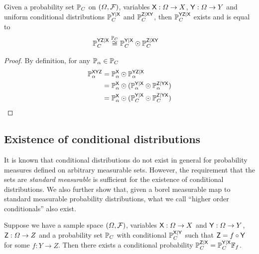 \begin{theorem}\label{lem:joint_conditional}
Given a probability set $\mathbb{P}_C$ on $(\Omega,\mathcal{F})$, variables $\mathsf{X}:\Omega\to X$, $\mathsf{Y}:\Omega\to Y$ and uniform conditional distributions $\mathbb{P}_C^{\mathsf{Y}|\mathsf{X}}$ and $\mathbb{P}_C^{\mathsf{Z}|\mathsf{XY}}$, then $\mathbb{P}_C^{\mathsf{YZ}|\mathsf{X}}$ exists and is equal to
\begin{align}
    \mathbb{P}_C^{\mathsf{YZ}|\mathsf{X}} &\overset{\mathbb{P}_C}{\cong} \mathbb{P}_C^{\mathsf{Y}|\mathsf{X}}\odot \mathbb{P}_C^{\mathsf{Z}|\mathsf{XY}}
\end{align}
\end{theorem}

\begin{proof}
By definition, for any $\mathbb{P}_\alpha\in \mathbb{P}_C$
\begin{align}
    \mathbb{P}_\alpha^{\mathsf{XYZ}} &= \mathbb{P}_\alpha^{\mathsf{X}}\odot \mathbb{P}_\alpha^{\mathsf{YZ}|\mathsf{X}}\\
                               &= \mathbb{P}_\alpha^{\mathsf{X}}\odot(\mathbb{P}_\alpha^{\mathsf{Y}|\mathsf{X}}\odot \mathbb{P}_\alpha^{\mathsf{Z}|\mathsf{YX}})\\
                               &= \mathbb{P}_\alpha^{\mathsf{X}}\odot(\mathbb{P}_C^{\mathsf{Y}|\mathsf{X}}\odot \mathbb{P}_C^{\mathsf{Z}|\mathsf{YX}})
\end{align}
\end{proof}

\subsection{Existence of conditional distributions}

It is known that conditional distributions do not exist in general for probability measures defined on arbitrary measurable sets. However, the requirement that the sets are \emph{standard measurable} is sufficient for the existence of conditional distributions. We also further show that, given a borel measurable map to standard measurable probability distributions, what we call ``higher order conditionals'' also exist.

\begin{lemma}\label{th:recurs_pushf}
Suppose we have a sample space $(\Omega,\mathcal{F})$, variables $\mathsf{X}:\Omega\to X$ and $\mathsf{Y}:\Omega\to Y$, $\mathsf{Z}:\Omega\to Z$ and a probability set $\mathbb{P}_C$ with conditional $\mathbb{P}_C^{\mathsf{X}|\mathsf{Y}}$ such that $\mathsf{Z}=f\circ \mathsf{Y}$ for some $f:Y\to Z$. Then there exists a conditional probability $\mathbb{P}_C^{\mathsf{Z}|\mathsf{X}}=\mathbb{P}_C^{\mathsf{Y}|\mathsf{X}}\mathbb{F}_{f}$.
\end{lemma}

